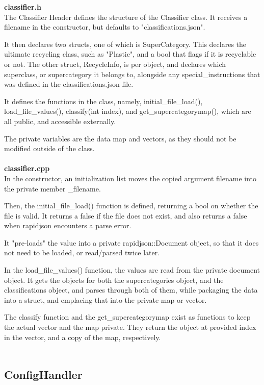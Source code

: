 \documentclass[conference]{IEEEtran}
\begin{document}
\textbf{classifier.h}~\\

The Classifier Header defines the structure of the Classifier class. It receives a filename in the constructor, but defaults to "classifications.json".

It then declares two structs, one of which is SuperCategory. This declares the ultimate recycling class, such as "Plastic", and a bool that flags if it is recyclable or not. The other struct, RecycleInfo, is per object, and declares which superclass, or supercategory it belongs to, alongside any special\_instructions that was defined in the classifications.json file. 

It defines the functions in the class, namely, initial\_file\_load(), load\_file\_values(), classify(int index), and get\_supercategorymap(), which are all public, and accessible externally.

The private variables are the data map and vectors, as they should not be modified outside of the class.~\\~\\


\textbf{classifier.cpp}~\\

In the constructor, an initialization list moves the copied argument filename into the private member \_filename. 

Then, the initial\_file\_load() function is defined, returning a bool on whether the file is valid. It returns a false if the file does not exist, and also returns a false when rapidjson encounters a parse error.

It "pre-loads" the value into a private rapidjson::Document object, so that it does not need to be loaded, or read/parsed twice later.

In the load\_file\_values() function, the values are read from the private document object. It gets the objects for both the supercategories object, and the classifications object, and parses through both of them, while packaging the data into a struct, and emplacing that into the private map or vector.

The classify function and the get\_supercategorymap exist as functions to keep the actual vector and the map private. They return the object at provided index in the vector, and a copy of the map, respectively.~\\~\\


\subsection{ConfigHandler}
\end{document}
